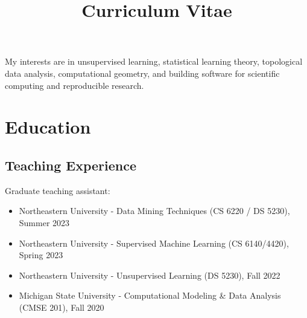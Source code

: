 \documentclass[11pt,a4paper,sans]{moderncv} %
\title{Curriculum Vitae}
\begin{document}


%
%
%
%
%


\makecvtitle %

My interests are in unsupervised learning, statistical learning theory, topological data analysis, computational geometry, and building software for scientific computing and reproducible research.  
\section{Education}

\subsection{Teaching Experience}
Graduate teaching assistant: 
\begin{itemize}
\setlength\itemsep{-0.5em}	
\item Northeastern University - Data Mining Techniques (CS 6220 / DS 5230), Summer 2023
\item Northeastern University - Supervised Machine Learning (CS 6140/4420), Spring 2023 
\item Northeastern University - Unsupervised Learning (DS 5230), Fall 2022
\item Michigan State University - Computational Modeling \& Data Analysis (CMSE 201), Fall 2020
\end{itemize}
 
\end{document}
